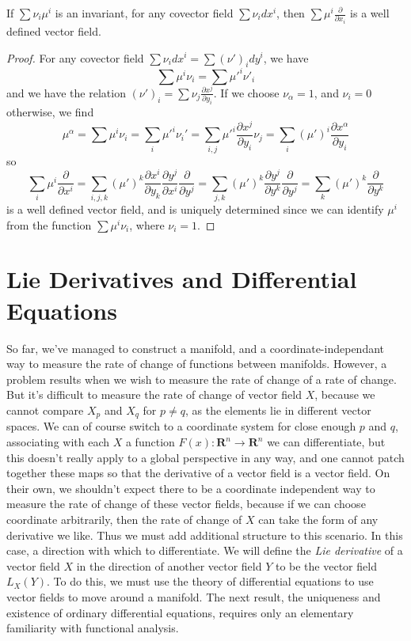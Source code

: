 \begin{theorem}
    If $\sum \nu_i \mu^i$ is an invariant, for any covector field $\sum \nu_i dx^i$, then $\sum \mu^i \frac{\partial}{\partial x_i}$ is a well defined vector field.
\end{theorem}
\begin{proof}
    For any covector field $\sum \nu_i dx^i = \sum (\nu')_i dy^i$, we have
    \[ \sum \mu^i \nu_i = \sum \mu'^i \nu'_i \]
    and we have the relation $(\nu')_i = \sum \nu_j \frac{\partial x^j}{\partial y_i}$. If we choose $\nu_\alpha = 1$, and $\nu_i = 0$ otherwise, we find
    \[ \mu^\alpha = \sum \mu^i \nu_i = \sum_i \mu'^i \nu_i' = \sum_{i,j} \mu'^i \frac{\partial x^j}{\partial y_i} \nu_j = \sum_i (\mu')^i \frac{\partial x^\alpha}{\partial y_i} \]
    so
    \[ \sum_i \mu^i \frac{\partial}{\partial x^i} = \sum_{i,j,k} (\mu')^k \frac{\partial x^i}{\partial y_k} \frac{\partial y^j}{\partial x^i} \frac{\partial}{\partial y^j} = \sum_{j,k} (\mu')^k \frac{\partial y^j}{\partial y^k} \frac{\partial}{\partial y^j} = \sum_k (\mu')^k \frac{\partial}{\partial y^k} \]
    is a well defined vector field, and is uniquely determined since we can identify $\mu^i$ from the function $\sum \mu^i \nu_i$, where $\nu_i = 1$.
\end{proof}









\chapter{Lie Derivatives and Differential Equations}

So far, we've managed to construct a manifold, and a coordinate-independant way to measure the rate of change of functions between manifolds. However, a problem results when we wish to measure the rate of change of a rate of change. But it's difficult to measure the rate of change of vector field $X$, because we cannot compare $X_p$ and $X_q$ for $p \neq q$, as the elements lie in different vector spaces. We can of course switch to a coordinate system for close enough $p$ and $q$, associating with each $X$ a function $F(x) : \mathbf{R}^n \to \mathbf{R}^n$ we can differentiate, but this doesn't really apply to a global perspective in any way, and one cannot patch together these maps so that the derivative of a vector field is a vector field. On their own, we shouldn't expect there to be a coordinate independent way to measure the rate of change of these vector fields, because if we can choose coordinate arbitrarily, then the rate of change of $X$ can take the form of any derivative we like. Thus we must add additional structure to this scenario. In this case, a direction with which to differentiate. We will define the {\it Lie derivative} of a vector field $X$ in the direction of another vector field $Y$ to be the vector field $L_X(Y)$. To do this, we must use the theory of differential equations to use vector fields to move around a manifold. The next result, the uniqueness and existence of ordinary differential equations, requires only an elementary familiarity with functional analysis.

